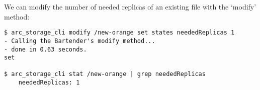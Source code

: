 \documentclass{book}
\begin{document}
We can modify the number of needed replicas of an existing file with the `modify' method:

\begin{verbatim}
$ arc_storage_cli modify /new-orange set states neededReplicas 1
- Calling the Bartender's modify method...
- done in 0.63 seconds.
set

$ arc_storage_cli stat /new-orange | grep neededReplicas
    neededReplicas: 1
\end{verbatim}

% 
% 
% 
% 
% 
% 
% 


% 
\end{document}

